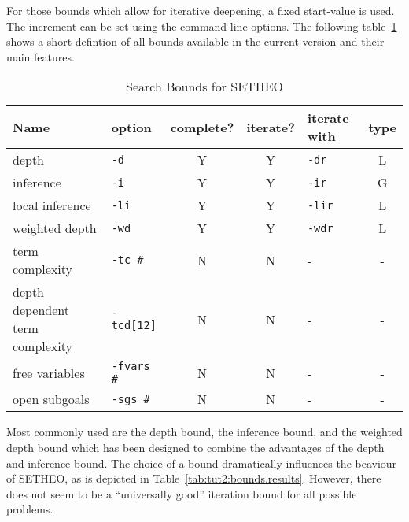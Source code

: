 For those bounds which allow for iterative deepening, a fixed start-value
is used. The increment can be set using the command-line options.
The following table~\ref{tab:tut2:bounds:list} shows a short
defintion of all bounds available in the current version and their main
features.

\begin{table}[htb]
\begin{center}
\small
\begin{tabular}{|l|l|c|c|l|c|}
\hline
Name & option & complete? & iterate? & iterate with & type \\
\hline\hline
depth & {\tt -d} & Y & Y & {\tt -dr} & L \\
inference & {\tt -i} & Y & Y & {\tt -ir} & G \\
local inference & {\tt -li} & Y & Y & {\tt -lir} & L \\
weighted depth & {\tt -wd} & Y & Y & {\tt -wdr} & L \\
\hline
term complexity & {\tt -tc \#} & N & N & - & - \\
depth dependent term complexity & {\tt -tcd[12]} & N & N & - & - \\
free variables & {\tt -fvars \#} & N & N & - & - \\
open subgoals & {\tt -sgs \#} & N & N & - & - \\
\hline
\end{tabular}
\end{center}
\caption{Search Bounds for SETHEO}
\label{tab:tut2:bounds:list}
\end{table}

Most commonly used are the depth bound, the inference bound, and the
weighted depth bound which has been designed to combine the advantages
of the depth and inference bound. The choice of a bound dramatically
influences the beaviour of SETHEO, as is depicted in
Table~\ref{tab:tut2:bounds.results}. However, there does not seem
to be a ``universally good'' iteration bound for all possible problems.

